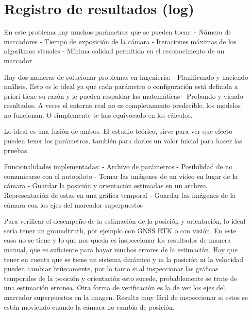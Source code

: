 \section{Registro de resultados (log)}

En este problema hay muchos parámetros que se pueden tocar:
- Número de marcadores
- Tiempo de exposición de la cámara
- Iteraciones máximas de los algoritmos visuales
- Mínima calidad permitida en el reconocimento de un marcador 

Hay dos maneras de solucionar problemas en ingenieria:
- Planificando y haciendo análisis. Esto es lo ideal ya que cada parámetro o configuración está definida a priori tiene su razón y le pueden respaldar las matemáticas
- Probando y viendo resultados. A veces el entorno real no es completamente predecible, los modelos no funcionan. O simplemente te has equivocado en los cálculos.

Lo ideal es una fusión de ambos. El estudio teórico, sirve para ver que efecto pueden tener los parámetros, también para darles un valor inicial para hacer las pruebas.  


Funcionalidades implementadas:
- Archivo de parámetros
- Posibilidad de no comunicarse con el autopiloto
- Tomar las imágenes de un vídeo en lugar de la cámara
- Guardar la posición y orientación estimadas en un archivo. Representación de estas en una gráfica temporal
- Guardar las imágenes de la cámara con los ejes del marcador superpuestos  

Para verificar el desempeño de la estimación de la posición y orientación, lo ideal sería tener un groundtruth, por ejemplo con GNSS RTK o con visión. En este caso no se tiene y lo que nos queda es inspeccionar los resultados de manera manual, que es suficiente para hayar muchos errores de la estimación. Hay que tener en cuenta que se tiene un sistema dinámico y ni la posición ni la velocidad pueden cambiar brúscamente, por lo tanto si al inspeccionar las gráficas temporales de la posición y orientación esto sucede, probablemente se trate de una estimación erronea. Otra forma de verificación es la de ver los ejes del marcador superpuestos en la imagen. Resulta muy fácil de inspeccionar si estos se están moviendo cuando la cámara no cambia de posición.    

\endinput
